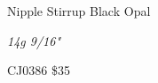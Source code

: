 \documentclass[8pt]{article}
\date{\today}
\title{}
\begin{document}
\begin{center}{\large{Nipple Stirrup Black Opal}}

\end{center}
\begin{center}{\Large\textit{14g 9/16"}}

\end{center}
\begin{center}{\large{CJ0386\hspace{25mm}  \$35}}

\end{center}
\end{document}
